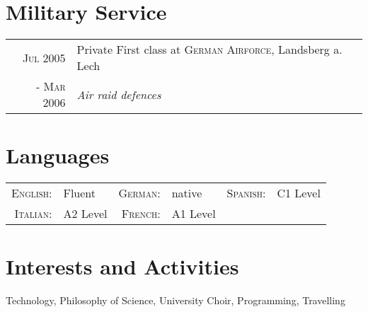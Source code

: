 \documentclass[a4paper,10pt]{article}
\begin{document}
\section{Military Service}
\begin{tabular}{r|p{11cm}}
 \textsc{Jul 2005}& Private First class at \textsc{German Airforce}, Landsberg a. Lech \\\textsc{- Mar 2006}&\emph{Air raid defences}\\
\end{tabular}

\section{Languages}
\begin{tabular}{rlrlrl}
\textsc{English:}&Fluent&\textsc{German:}& native&\textsc{Spanish:}& C1 Level\\
\textsc{Italian:}&  A2 Level&\textsc{French:}& A1 Level&&\\
\end{tabular}

\section{Interests and Activities}
Technology, Philosophy of Science, University Choir, Programming, Travelling\\


\end{document}
